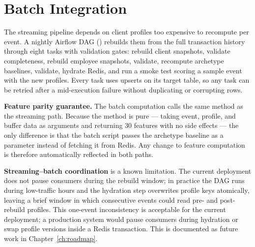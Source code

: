 \section{Batch Integration}

The streaming pipeline depends on client profiles too expensive to recompute per event. A nightly Airflow DAG () rebuilds them from the full transaction history through eight tasks with validation gates: rebuild client snapshots, validate completeness, rebuild employee snapshots, validate, recompute archetype baselines, validate, hydrate Redis, and run a smoke test scoring a sample event with the new profiles. Every task uses  upserts on its target table, so any task can be retried after a mid-execution failure without duplicating or corrupting rows.

\textbf{Feature parity guarantee.} The batch computation calls the same  method as the streaming path. Because the method is pure --- taking event, profile, and buffer data as arguments and returning 30 features with no side effects --- the only difference is that the batch script passes the archetype baseline as a parameter instead of fetching it from Redis. Any change to feature computation is therefore automatically reflected in both paths.

\textbf{Streaming--batch coordination} is a known limitation. The current deployment does not pause consumers during the rebuild window; in practice the DAG runs during low-traffic hours and the hydration step overwrites profile keys atomically, leaving a brief window in which consecutive events could read pre- and post-rebuild profiles. This one-event inconsistency is acceptable for the current deployment; a production system would pause consumers during hydration or swap profile versions inside a Redis transaction. This is documented as future work in Chapter~\ref{ch:roadmap}.
